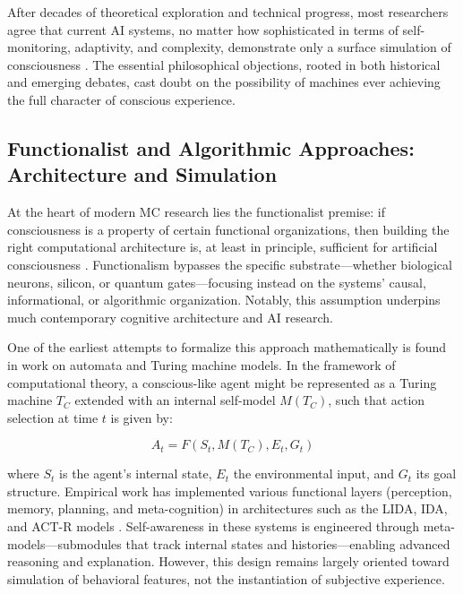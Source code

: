 After decades of theoretical exploration and technical progress, most researchers agree that current AI systems, no matter how sophisticated in terms of self-monitoring, adaptivity, and complexity, demonstrate only a surface simulation of consciousness \cite{gamez2008progress,garridomerchan2024machine,reggia2013rise}. The essential philosophical objections, rooted in both historical and emerging debates, cast doubt on the possibility of machines ever achieving the full character of conscious experience.

\subsection{Functionalist and Algorithmic Approaches: Architecture and Simulation}

At the heart of modern MC research lies the functionalist premise: if consciousness is a property of certain functional organizations, then building the right computational architecture is, at least in principle, sufficient for artificial consciousness \cite{reggia2013rise}. Functionalism bypasses the specific substrate---whether biological neurons, silicon, or quantum gates---focusing instead on the systems' causal, informational, or algorithmic organization. Notably, this assumption underpins much contemporary cognitive architecture and AI research.

One of the earliest attempts to formalize this approach mathematically is found in work on automata and Turing machine models. In the framework of computational theory, a conscious-like agent might be represented as a Turing machine $T_C$ extended with an internal self-model $M(T_C)$, such that action selection at time $t$ is given by:

\vspace{-2.0\baselineskip}
\begin{equation}
A_t = F(S_t, M(T_C), E_t, G_t)
\label{eq:action_selection}
\end{equation}
\vspace{-2.0\baselineskip}

where $S_t$ is the agent's internal state, $E_t$ the environmental input, and $G_t$ its goal structure. Empirical work has implemented various functional layers (perception, memory, planning, and meta-cognition) in architectures such as the LIDA, IDA, and ACT-R models \cite{franklin2014consciousness,gamez2008progress}. Self-awareness in these systems is engineered through meta-models---submodules that track internal states and histories---enabling advanced reasoning and explanation. However, this design remains largely oriented toward simulation of behavioral features, not the instantiation of subjective experience.

